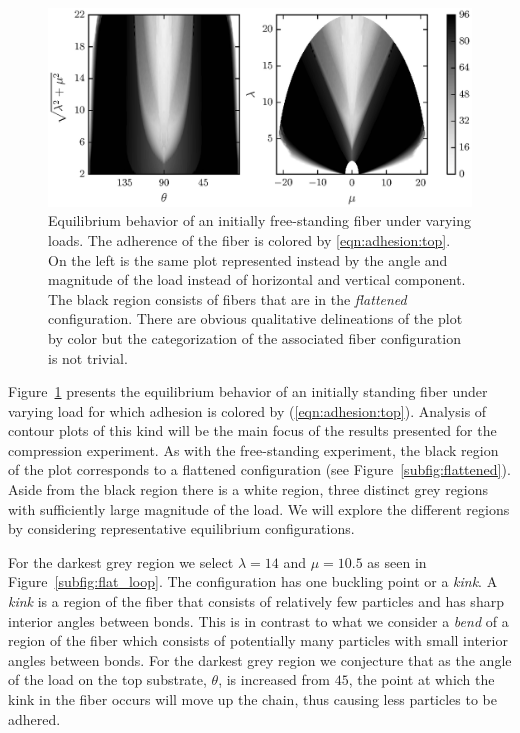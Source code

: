 	\begin{figure}[t]
		\begin{center}
			\includegraphics{./fig/ch3/push/ref/grid.eps}
		\end{center}		
		\caption{Equilibrium behavior of an initially free-standing fiber under varying loads. The adherence of the fiber is colored by \ref{eqn:adhesion:top}. On the left is the same plot represented instead by the angle and magnitude of the load instead of horizontal and vertical component. The black region consists of fibers that are in the \textit{flattened} configuration. There are obvious qualitative delineations of the plot by color but the categorization of the associated fiber configuration is not trivial.
		\label{fig:push:ref}}
	\end{figure}

Figure~\ref{fig:push:ref} presents the equilibrium behavior of an initially standing fiber under varying load for which adhesion is colored by (\ref{eqn:adhesion:top}). Analysis of contour plots of this kind will be the main focus of the results presented for the compression experiment. As with the free-standing experiment, the black region of the plot corresponds to a flattened configuration (see Figure~\ref{subfig:flattened}). Aside from the black region there is a white region, three distinct grey regions with sufficiently large magnitude of the load. We will explore the different regions by considering representative equilibrium configurations.

For the darkest grey region we select $\lambda=14$ and $\mu=10.5$ as seen in Figure~\ref{subfig:flat_loop}. The configuration has one buckling point or a \textit{kink}. A \textit{kink} is a region of the fiber that consists of relatively few particles and has sharp interior angles between bonds. This is in contrast to what we consider a \textit{bend} of a region of the fiber which consists of potentially many particles with small interior angles between bonds. For the darkest grey region we conjecture that as the angle of the load on the top substrate, $\theta$, is increased from $45$\textdegree, the point at which the kink in the fiber occurs will move up the chain, thus causing less particles to be adhered.

